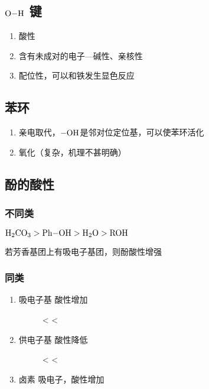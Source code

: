 \documentclass[a4paper]{ctexrep}
\begin{document}
    \subsection{$\ce{O-H}$ 键}
    \begin{enumerate}
        \item 酸性
        \item 含有未成对的电子---碱性、亲核性
        \item 配位性，可以和铁发生显色反应
    \end{enumerate}

    \subsection{苯环}
    \begin{enumerate}
        \item 亲电取代，$\ce{-OH}$是邻对位定位基，可以使苯环活化
        \item 氧化（复杂，机理不甚明确）
    \end{enumerate}

    \subsection{酚的酸性}

    \subsubsection{不同类}
    $\ce{H2CO3} > \ce{Ph-OH} > \ce{H2O} > \ce{ROH}$

    若芳香基团上有吸电子基团，则酚酸性增强

    \subsubsection{同类}

    \begin{enumerate}
        \item 吸电子基 酸性增加 \par
        \begin{figure}[H]
            \scriptsize
            \centering
             <  < 
        \end{figure}
        \item 供电子基 酸性降低 \par
        \begin{figure}[H]   
            \scriptsize
            \centering
             <  < 
        \end{figure}
        \item 卤素 吸电子，酸性增加
    \end{enumerate}
\end{document}
